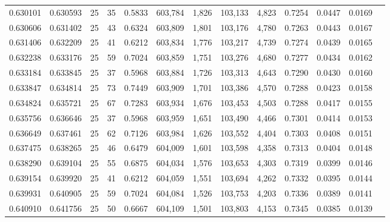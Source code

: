 \begin{tabular}{rrrrrrrrrrrrr}
0.630101 & 0.630593 &    25 &  35 &                                     0.5833 & 603,784 &   1,826 & 103,133 &   4,823 & 0.7254 & 0.0447 & 0.0169 \\
0.630606 & 0.631402 &    25 &  43 &                                     0.6324 & 603,809 &   1,801 & 103,176 &   4,780 & 0.7263 & 0.0443 & 0.0167 \\
0.631406 & 0.632209 &    25 &  41 &                                     0.6212 & 603,834 &   1,776 & 103,217 &   4,739 & 0.7274 & 0.0439 & 0.0165 \\
0.632238 & 0.633176 &    25 &  59 &                                     0.7024 & 603,859 &   1,751 & 103,276 &   4,680 & 0.7277 & 0.0434 & 0.0162 \\
0.633184 & 0.633845 &    25 &  37 &                                     0.5968 & 603,884 &   1,726 & 103,313 &   4,643 & 0.7290 & 0.0430 & 0.0160 \\
0.633847 & 0.634814 &    25 &  73 &                                     0.7449 & 603,909 &   1,701 & 103,386 &   4,570 & 0.7288 & 0.0423 & 0.0158 \\
0.634824 & 0.635721 &    25 &  67 &                                     0.7283 & 603,934 &   1,676 & 103,453 &   4,503 & 0.7288 & 0.0417 & 0.0155 \\
0.635756 & 0.636646 &    25 &  37 &                                     0.5968 & 603,959 &   1,651 & 103,490 &   4,466 & 0.7301 & 0.0414 & 0.0153 \\
0.636649 & 0.637461 &    25 &  62 &                                     0.7126 & 603,984 &   1,626 & 103,552 &   4,404 & 0.7303 & 0.0408 & 0.0151 \\
0.637475 & 0.638265 &    25 &  46 &                                     0.6479 & 604,009 &   1,601 & 103,598 &   4,358 & 0.7313 & 0.0404 & 0.0148 \\
0.638290 & 0.639104 &    25 &  55 &                                     0.6875 & 604,034 &   1,576 & 103,653 &   4,303 & 0.7319 & 0.0399 & 0.0146 \\
0.639154 & 0.639920 &    25 &  41 &                                     0.6212 & 604,059 &   1,551 & 103,694 &   4,262 & 0.7332 & 0.0395 & 0.0144 \\
0.639931 & 0.640905 &    25 &  59 &                                     0.7024 & 604,084 &   1,526 & 103,753 &   4,203 & 0.7336 & 0.0389 & 0.0141 \\
0.640910 & 0.641756 &    25 &  50 &                                     0.6667 & 604,109 &   1,501 & 103,803 &   4,153 & 0.7345 & 0.0385 & 0.0139 \\

\end{tabular}
